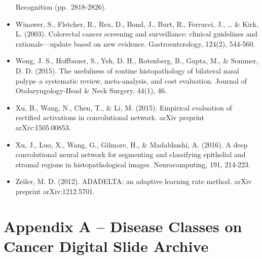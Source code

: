 \documentclass[12pt,]{article}
\begin{document}
\begin{itemize}
  Recognition (pp.~2818-2826).
\item
  Winawer, S., Fletcher, R., Rex, D., Bond, J., Burt, R., Ferrucci, J.,
  \ldots{} \& Kirk, L. (2003). Colorectal cancer screening and
  surveillance: clinical guidelines and rationale---update based on new
  evidence. Gastroenterology, 124(2), 544-560.
\item
  Wong, J. S., Hoffbauer, S., Yeh, D. H., Rotenberg, B., Gupta, M., \&
  Sommer, D. D. (2015). The usefulness of routine histopathology of
  bilateral nasal polyps--a systematic review, meta-analysis, and cost
  evaluation. Journal of Otolaryngology-Head \& Neck Surgery, 44(1), 46.
\item
  Xu, B., Wang, N., Chen, T., \& Li, M. (2015). Empirical evaluation of
  rectified activations in convolutional network. arXiv preprint
  arXiv:1505.00853.
\item
  Xu, J., Luo, X., Wang, G., Gilmore, H., \& Madabhushi, A. (2016). A
  deep convolutional neural network for segmenting and classifying
  epithelial and stromal regions in histopathological images.
  Neurocomputing, 191, 214-223.
\item
  Zeiler, M. D. (2012). ADADELTA: an adaptive learning rate method.
  arXiv preprint arXiv:1212.5701.
\end{itemize}

\newpage

\section{Appendix A -- Disease Classes on Cancer Digital Slide
Archive}\label{appendix-a-disease-classes-on-cancer-digital-slide-archive}
\end{document}
